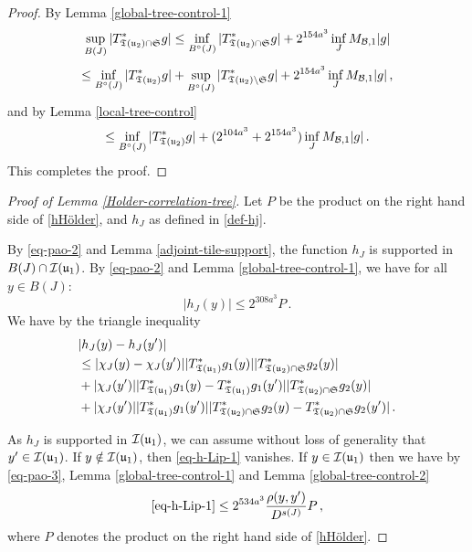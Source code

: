 {    \begin{proof}
        By Lemma \ref{global-tree-control-1}
        $$
            \sup_{B(J)} |T^*_{{\mathfrak T}({\mathfrak u}_2) \cap \mathfrak{S}} g| \le \inf_{B^\circ{}(J)} |T_{{\mathfrak T}({\mathfrak u}_2) \cap \mathfrak{S}}^* g| +  2^{154a^3} \inf_{J} M_{\mathcal{B}, 1} |g|
        $$
        $$
            \le \inf_{B^\circ{}(J)} |T_{{\mathfrak T}({\mathfrak u}_2)}^* g| + \sup_{B^\circ{}(J)} |T_{{\mathfrak T}({\mathfrak u}_2) \setminus \mathfrak{S}}^* g| +  2^{154a^3} \inf_{J} M_{\mathcal{B}, 1} |g|\,,
        $$
        and by Lemma \ref{local-tree-control}
        $$
            \le \inf_{B^\circ{}(J)} |T_{{\mathfrak T}({\mathfrak u}_2)}^* g| + (2^{104a^3} + 2^{154a^3}) \inf_{J} M_{\mathcal{B}, 1} |g|\,.
        $$
        This completes the proof.
    \end{proof}



    \begin{proof}[Proof of Lemma \ref{Holder-correlation-tree}]
        Let $P$ be the product on the right hand side of \eqref{hHölder}, and $h_J$ as defined in \eqref{def-hj}.

        By \eqref{eq-pao-2} and Lemma \ref{adjoint-tile-support}, the function $h_J$ is supported in $B(J) \cap {\mathcal{I}}({\mathfrak u}_1)$.
        By \eqref{eq-pao-2} and Lemma \ref{global-tree-control-1}, we have for all $y \in B(J)$:
        $$
            |h_J(y)| \le 2^{308a^3} P\,.
        $$
        We have by the triangle inequality
        \begin{align}
            &|h_J(y) - h_J(y')|\nonumber\\
            \label{eq-h-Lip-1}
            &\le |\chi_J(y) - \chi_J(y')| |T_{{\mathfrak T}({\mathfrak u}_1)}^* g_1(y)| |T_{{\mathfrak T}({\mathfrak u}_2) \cap \mathfrak{S}}^* g_2(y)|\\
            \label{eq-h-Lip-2}
            & + |\chi_J(y')| |T_{{\mathfrak T}({\mathfrak u}_1)}^* g_1(y) - T_{{\mathfrak T}({\mathfrak u}_1)}^* g_1(y')| |T_{{\mathfrak T}({\mathfrak u}_2) \cap \mathfrak{S}}^* g_2(y)|\\
            \label{eq-h-Lip-3}
            & + |\chi_J(y')| |T_{{\mathfrak T}({\mathfrak u}_1)}^* g_1(y')| |T_{{\mathfrak T}({\mathfrak u}_2) \cap \mathfrak{S}}^* g_2(y) - T_{{\mathfrak T}({\mathfrak u}_2) \cap \mathfrak{S}}^* g_2(y')|\,.
        \end{align}

        As $h_J$ is supported in ${\mathcal{I}}({\mathfrak u}_1)$, we can assume without loss of generality that $y' \in {\mathcal{I}}({\mathfrak u}_1)$.
        If $y \notin {\mathcal{I}}({\mathfrak u}_1)$, then \eqref{eq-h-Lip-1} vanishes. If $y \in {\mathcal{I}}({\mathfrak u}_1)$ then we have by \eqref{eq-pao-3}, Lemma \ref{global-tree-control-1} and Lemma \ref{global-tree-control-2}
        $$
            \eqref{eq-h-Lip-1} \le 2^{534a^3} \frac{\rho(y,y')}{D^{s(J)}} P\,,
        $$
        where $P$ denotes the product on the right hand side of \eqref{hHölder}.


\end{proof}}
